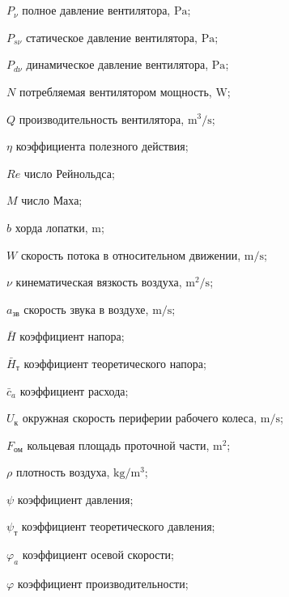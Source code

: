 \chapter*{\nomname}                         %
\eqexplSetIntro{}

\begin{eqexpl}
\item{\(P_\nu\)} полное давление вентилятора, \(\si\pascal\);
\item{\(P_{s\nu}\)} статическое давление вентилятора, \(\si\pascal\);
\item{\(P_{d\nu}\)} динамическое давление вентилятора, \(\si\pascal\);
\item{\(N\)} потребляемая вентилятором мощность, \(\si\watt\);
\item{\(Q\)} производительность вентилятора, $\si\meter^3/\si\second$;
\item{\(\eta\)} коэффициента полезного действия; 
\item{\(Re\)} число Рейнольдса;
\item{\(M\)} число Маха;
\item{\(b\)} хорда лопатки, $\si\meter$;
\item{\(W\)} скорость потока в относительном движении, $\si\meter/\si\second$;
\item{\(\nu\)} кинематическая вязкость воздуха, $\si\meter^2/\si\second$;
\item{\(a_{\text{зв}}\)} скорость звука в воздухе, $\si\meter/\si\second$;
\item{\(\bar{H}\)} коэффициент напора;
\item{\(\bar{H}_{\text{т}}\)} коэффициент теоретического напора;
\item{\(\bar{c}_{a}\)} коэффициент расхода;
\item{\(U_\text{к}\)} окружная скорость периферии рабочего колеса, $\si\meter/\si\second$;
\item{\(F_{\text{ом}}\)} кольцевая площадь проточной части, \(\si{\meter}^2\);
\item{\(\rho\)} плотность воздуха, \(\si{\kilogram}/\si{\meter}^3\);
\item{\(\psi\)}	коэффициент давления;
\item{\(\psi_{\text{т}}\)} коэффициент теоретического давления;
\item{\(\varphi_{a}\)} коэффициент осевой скорости;
\item{\(\varphi\)} коэффициент производительности;

\end{eqexpl}
